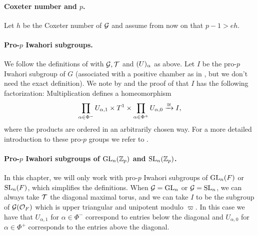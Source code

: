 \paragraph{Coxeter number and $p$.} Let $h$ be the Coxeter number of $\mathcal{G}$ and assume from now on that $p-1 > eh$.


\paragraph{Pro-$p$ Iwahori subgroups.} We follow the definitions of \cite{SchOll-modular} with $\mathcal{G}, \mathcal{T}$ and $\mathcal{(}U)_{\alpha}$ as above. Let $I$ be the pro-$p$ Iwahori subgroup of $G$ (associated with a positive chamber as in \cite{SchOll-modular}, but we don't need the exact definition). We note by \cite[Lem.~2.1(i)]{SchOll-modular} and the proof of \cite[Lem.~2.3]{SchOll-modular} that $I$ has the following factorization: Multiplication defines a homeomorphism
\begin{equation*}
  \prod_{\alpha \in \Phi^{-}} U_{\alpha,1} \times T^{1} \times \prod_{\alpha \in \Phi^{+}} U_{\alpha,0} \xrightarrow{\cong} I,
\end{equation*}
where the products are ordered in an arbitrarily chosen way. For a more detailed introduction to these pro-$p$ groups we refer to \cite{SchOll-modular}.

\paragraph{Pro-$p$ Iwahori subgroups of $\operatorname{GL}_{n}(\mathbb{Z}_{p})$ and $\operatorname{SL}_{n}(\mathbb{Z}_{p})$.} In this chapter, we will only work with pro-$p$ Iwahori subgroups of $\operatorname{GL}_{n}(F)$ or $\operatorname{SL}_{n}(F)$, which simplifies the definitions. When $\mathcal{G} = \operatorname{GL}_{n}$ or $\mathcal{G} = \operatorname{SL}_{n}$, we can always take $\mathcal{T}$ the diagonal maximal torus, and we can take $I$ to be the subgroup of $\mathcal{G}(\mathcal{O}_{F})$ which is upper triangular and unipotent modulo $\varpi$. In this case we have that $U_{\alpha,1}$ for $\alpha \in \Phi^{-}$ correspond to entries below the diagonal and $U_{\alpha,0}$ for $\alpha \in \Phi^{+}$ corresponds to the entries above the diagonal.

